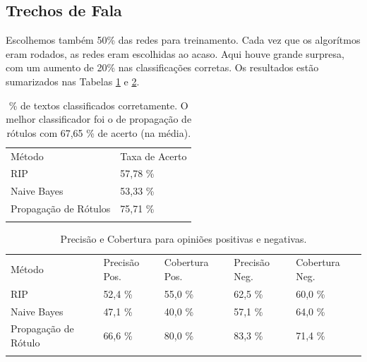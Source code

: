 \documentclass[12pt]{article}
\begin{document}
\subsection{Trechos de Fala}
Escolhemos também 50\% das redes para treinamento. Cada vez que os algorítmos eram rodados, as redes eram escolhidas ao acaso. Aqui houve grande surpresa, com um aumento de 20\% nas classificações corretas. Os resultados estão sumarizados nas Tabelas \ref{tab:5rec} e \ref{tab:preerec}.

\begin{table}
\centering
\caption{\% de textos classificados corretamente. O melhor classificador foi o de propagação de rótulos com 67,65 \% de acerto (na média).} 
\label{tab:5rec}       %
\begin{tabular}{p{4.5cm}p{2cm}}
\hline\noalign{\smallskip}
Método & Taxa de Acerto    \\
\noalign{\smallskip}\svhline\noalign{\smallskip}
RIP & 57,78 \%\\
Naive Bayes & 53,33 \%\\
Propagação de Rótulos & 75,71 \%\\
\noalign{\smallskip}\hline\noalign{\smallskip}
\end{tabular}
\end{table}

\begin{table}
\centering
\caption{Precisão e Cobertura para opiniões positivas e negativas.}
\label{tab:preerec}       %
\begin{tabular}{p{1.5cm}p{1cm}p{1cm}p{1cm}p{1cm}}
\hline\noalign{\smallskip}
{\footnotesize Método} & {\footnotesize Precisão Pos.} & {\footnotesize Cobertura Pos.} & {\footnotesize Precisão Neg.} & {\footnotesize Cobertura Neg.} \\
\noalign{\smallskip}\svhline\noalign{\smallskip}
{\footnotesize RIP} & {\footnotesize 52,4 \%}  & {\footnotesize 55,0 \%} & {\footnotesize 62,5 \%} & {\footnotesize 60,0 \%} \\
{\footnotesize Naive Bayes} & {\footnotesize 47,1 \%} & {\footnotesize 40,0 \%} & {\footnotesize 57,1 \%} & {\footnotesize 64,0 \%} \\
{\footnotesize Propagação de Rótulo} & {\footnotesize 66,6 \%} & {\footnotesize 80,0 \%} & {\footnotesize 83,3 \%} & {\footnotesize 71,4 \%} \\
\noalign{\smallskip}\hline\noalign{\smallskip}
\end{tabular}
\end{table}
\end{document}
